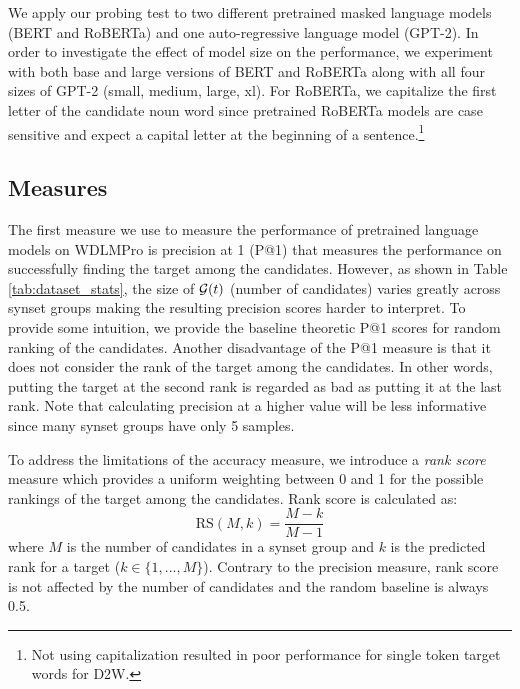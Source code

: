 \documentclass[11pt,a4paper]{article}
\begin{document}
We apply our probing test to two different pretrained
masked language models (BERT and
RoBERTa) and one auto-regressive language model
(GPT-2). 
In order to investigate the effect of model
size on the performance, we experiment with both
base and large versions of BERT and RoBERTa
along with all four sizes of GPT-2 (small, medium,
large, xl). 
For RoBERTa, we capitalize the first letter of the candidate
noun word since pretrained RoBERTa models are case sensitive
and expect a capital letter at the beginning of a
sentence.\footnote{Not using capitalization  resulted in
  poor performance for single token target words for D2W.}

\subsection{Measures}

  
The first measure we use to measure the performance of
pretrained language models on WDLMPro is precision at 1 (P@1) that measures the performance on successfully finding the target among the candidates. 
However, as shown in Table \ref{tab:dataset_stats}, the size of ${\cal G}(t)$ (number of candidates) varies greatly across synset groups making the resulting precision scores harder to interpret. 
To provide some intuition, we provide the baseline theoretic
P@1 scores for random ranking of the candidates. 
Another disadvantage of the P@1 measure is that it does not consider the rank of the target among the candidates. 
In other words, putting the target at the second rank is regarded as bad as putting it at the last rank. Note that calculating precision at a higher value will be less informative since many synset groups have only 5 samples. 

  
To address the limitations of the accuracy measure, we introduce a \textit{rank score} measure which provides a uniform weighting between 0 and 1 for the possible rankings of the target among the candidates. Rank score is calculated as:
\begin{equation*}
    \text{RS}(M,k) = \frac{M-k}{M-1}
\end{equation*}
where $M$ is the number of candidates in a synset group and $k$ is the predicted rank for a target ($k \in
\{1,...,M\}$). Contrary to the precision measure, rank score is not affected by the number of candidates and the random baseline is always 0.5.  
\end{document}
